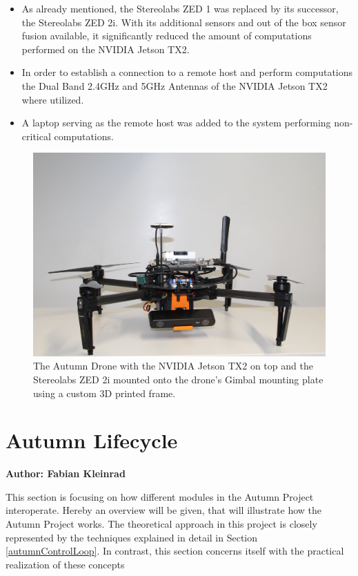 \begin{itemize}
	\item As already mentioned, the Stereolabs ZED 1 was replaced by its successor, the Stereolabs ZED 2i. With its additional sensors and out of the box sensor fusion available, it significantly reduced the amount of computations performed on the NVIDIA Jetson TX2. 
	\item In order to establish a connection to a remote host and perform computations the Dual Band 2.4GHz and 5GHz Antennas of the NVIDIA Jetson TX2 where utilized. 
	\item A laptop serving as the remote host was added to the system performing non-critical computations.
\end{itemize}

\begin{figure}
	\centering
	\includegraphics[width=0.9\linewidth]{img/autumnDrone}
	\caption{
		The Autumn Drone with the NVIDIA Jetson TX2 on top and the Stereolabs ZED 2i mounted onto the drone's Gimbal mounting plate using a custom 3D printed frame. 
	}
	\label{fig:autumn}
\end{figure}


\section{Autumn Lifecycle}
\textbf{Author: Fabian Kleinrad} 


This section is focusing on how different modules in the Autumn Project interoperate. Hereby an overview will be given, that will illustrate how the Autumn Project works. The theoretical approach in this project is closely represented by the techniques explained in detail in Section 
\ref{autumnControlLoop}. In contrast, this section concerns itself with the practical realization of these concepts

